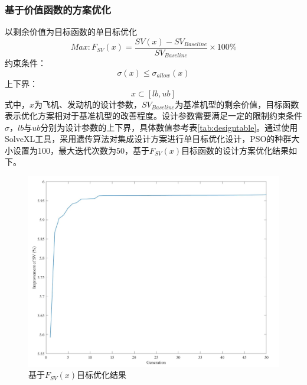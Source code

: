 \documentclass[12pt,a4paper]{report}
\begin{document}
\subsubsection{基于价值函数的方案优化}
以剩余价值为目标函数的单目标优化
\begin{equation}
Max: F_{SV}(x)=\frac{SV(x)-SV_{Baseline}}{SV_{Baseline}}\times100\%
\end{equation}
约束条件：
\begin{equation}
\sigma(x)\leq \sigma_{allow}(x)
\end{equation}
上下界：
\begin{equation}
x\subset[lb,ub]
\end{equation}
式中，$x$为飞机、发动机的设计参数，$SV_{Baseline}$为基准机型的剩余价值，目标函数表示优化方案相对于基准机型的改善程度。设计参数需要满足一定的限制约束条件$\sigma$，$lb$与$ub$分别为设计参数的上下界，具体数值参考表\ref{tab:designtable}。通过使用SolveXL工具，采用遗传算法对集成设计方案进行单目标优化设计，PSO的种群大小设置为100，最大迭代次数为50，基于$F_{SV}(x)$目标函数的设计方案优化结果如下。
\begin{figure}[htp]
\centering
   \includegraphics[width=.8\textwidth]{eps/SVoptimization.jpg}
    \caption{基于$F_{SV}(x)$目标优化结果}
    \label{fig:SVoptimazation}
\end{figure}
\end{document}
